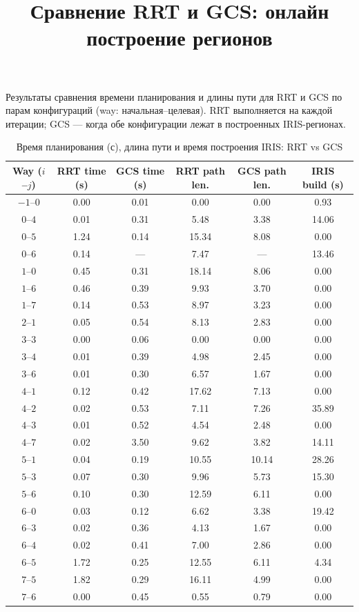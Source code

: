 \documentclass[a4paper]{article}
\title{Сравнение RRT и GCS: онлайн построение регионов}
\date{}
\begin{document}
\maketitle

Результаты сравнения времени планирования и длины пути для RRT и GCS по парам конфигураций (way: начальная--целевая). RRT выполняется на каждой итерации; GCS --- когда обе конфигурации лежат в построенных IRIS-регионах.

\begin{table}[htbp]
\centering
\caption{Время планирования (с), длина пути и время построения IRIS: RRT vs GCS}
\label{tab:online-gcs-rrt-gcs}
\begin{tabular}{c S[table-format=1.2] S[table-format=1.2] S[table-format=2.2] S[table-format=2.2] S[table-format=2.2]}
\toprule
{Way ($i$--$j$)} & {RRT time (s)} & {GCS time (s)} & {RRT path len.} & {GCS path len.} & {IRIS build (s)} \\
\midrule
$-1$--$0$  & 0.00 & 0.01 & 0.00 & 0.00 & 0.93 \\
$0$--$4$   & 0.01 & 0.31 & 5.48 & 3.38 & 14.06 \\
$0$--$5$   & 1.24 & 0.14 & 15.34 & 8.08 & 0.00 \\
$0$--$6$   & 0.14 &  & 7.47 &  & 13.46 \\
$1$--$0$   & 0.45 & 0.31 & 18.14 & 8.06 & 0.00 \\
$1$--$6$   & 0.46 & 0.39 & 9.93 & 3.70 & 0.00 \\
$1$--$7$   & 0.14 & 0.53 & 8.97 & 3.23 & 0.00 \\
$2$--$1$   & 0.05 & 0.54 & 8.13 & 2.83 & 0.00 \\
$3$--$3$   & 0.00 & 0.06 & 0.00 & 0.00 & 0.00 \\
$3$--$4$   & 0.01 & 0.39 & 4.98 & 2.45 & 0.00 \\
$3$--$6$   & 0.01 & 0.30 & 6.57 & 1.67 & 0.00 \\
$4$--$1$   & 0.12 & 0.42 & 17.62 & 7.13 & 0.00 \\
$4$--$2$   & 0.02 & 0.53 & 7.11 & 7.26 & 35.89 \\
$4$--$3$   & 0.01 & 0.52 & 4.54 & 2.48 & 0.00 \\
$4$--$7$   & 0.02 & 3.50 & 9.62 & 3.82 & 14.11 \\
$5$--$1$   & 0.04 & 0.19 & 10.55 & 10.14 & 28.26 \\
$5$--$3$   & 0.07 & 0.30 & 9.96 & 5.73 & 15.30 \\
$5$--$6$   & 0.10 & 0.30 & 12.59 & 6.11 & 0.00 \\
$6$--$0$   & 0.03 & 0.12 & 6.62 & 3.38 & 19.42 \\
$6$--$3$   & 0.02 & 0.36 & 4.13 & 1.67 & 0.00 \\
$6$--$4$   & 0.02 & 0.41 & 7.00 & 2.86 & 0.00 \\
$6$--$5$   & 1.72 & 0.25 & 12.55 & 6.11 & 4.34 \\
$7$--$5$   & 1.82 & 0.29 & 16.11 & 4.99 & 0.00 \\
$7$--$6$   & 0.00 & 0.45 & 0.55 & 0.79 & 0.00 \\
\bottomrule
\end{tabular}
\end{table}
\end{document}

